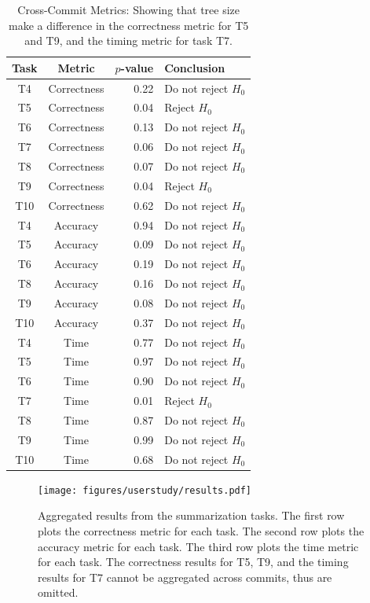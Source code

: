 \begin{table}[htpb]
  \centering
  \caption{Cross-Commit Metrics: Showing that tree size make a
    difference in the correctness metric for T5 and T9, and the timing
    metric for task T7.}
  \label{tab:cross_commit_results}
  \begin{tabular}{ccrl}
    \toprule
    Task & Metric      & $p$-value & Conclusion\\\midrule
    T4   & Correctness & 0.22      & Do not reject $H_0$\\
    T5   & Correctness & 0.04      & Reject $H_0$\\
    T6   & Correctness & 0.13      & Do not reject $H_0$\\
    T7   & Correctness & 0.06      & Do not reject $H_0$\\
    T8   & Correctness & 0.07      & Do not reject $H_0$\\
    T9   & Correctness & 0.04      & Reject $H_0$\\
    T10  & Correctness & 0.62      & Do not reject $H_0$\\

    T4  & Accuracy & 0.94 & Do not reject $H_0$\\
    T5  & Accuracy & 0.09 & Do not reject $H_0$\\
    T6  & Accuracy & 0.19 & Do not reject $H_0$\\
    T8  & Accuracy & 0.16 & Do not reject $H_0$\\
    T9  & Accuracy & 0.08 & Do not reject $H_0$\\
    T10 & Accuracy & 0.37 & Do not reject $H_0$\\

    T4  & Time & 0.77 & Do not reject $H_0$\\
    T5  & Time & 0.97 & Do not reject $H_0$\\
    T6  & Time & 0.90 & Do not reject $H_0$\\
    T7  & Time & 0.01 & Reject $H_0$\\
    T8  & Time & 0.87 & Do not reject $H_0$\\
    T9  & Time & 0.99 & Do not reject $H_0$\\
    T10 & Time & 0.68 & Do not reject $H_0$\\
    \bottomrule
  \end{tabular}
\end{table}

\begin{figure}[htpb]
  \centering
  \texttt{[image: figures/userstudy/results.pdf]}
  \caption{Aggregated results from the summarization tasks. The first row plots the
    correctness metric for each task. The second row plots the
    accuracy metric for each task. The third row plots the time metric
    for each task. The correctness results for T5, T9, and the timing
    results for T7 cannot be aggregated across commits, thus are
    omitted.}
  \label{fig:summarization_results}
\end{figure}

